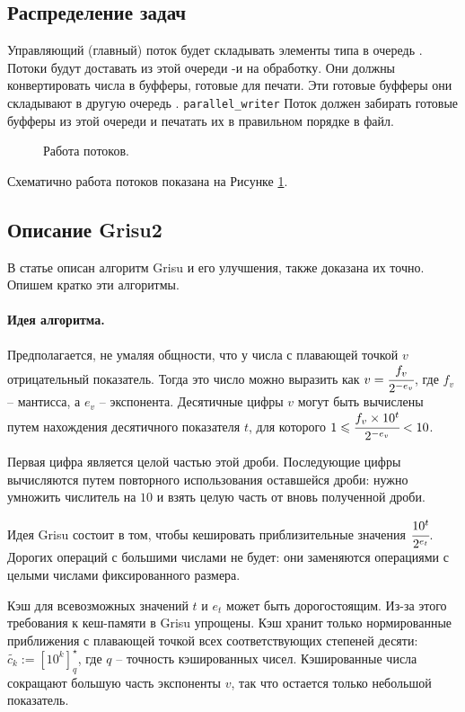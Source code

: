 \documentclass[a4paper, 12pt, twoside]{article}
\begin{document}
\subsection{Распределение задач}
Управляющий (главный) поток будет складывать элементы типа \texttt{} в очередь \texttt{}.
Потоки \texttt{} будут доставать из этой очереди \texttt{}-и на обработку.
Они должны конвертировать числа в буфферы, готовые для печати.
Эти готовые буфферы \texttt{} они складывают в другую очередь \texttt{}.
\texttt{\textcolor[rgb]{0.5,0,0}{parallel\_writer}}
Поток \texttt{} должен забирать готовые буфферы из этой очереди и печатать их в правильном порядке в файл.
\begin{figure}[h!]
\def\svgwidth{430pt}
  
  \caption{Работа потоков.} \label{draw}
\end{figure}

Схематично работа потоков показана на Рисунке \ref{draw}.

\subsection{Описание \textsf{Grisu2}}
В статье \cite{1} описан алгоритм \textsf{Grisu} и его улучшения, также доказана их точно.
Опишем кратко эти алгоритмы.
\paragraph{Идея алгоритма.}
Предполагается, не умаляя общности, что у числа с плавающей точкой $v$ отрицательный показатель. 
Тогда это число можно выразить как $v=\cfrac{f_v}{2^{-e_v}}$, где $f_v$ -- мантисса, а $e_v$ -- экспонента. 
Десятичные цифры $v$ могут быть вычислены путем нахождения десятичного показателя $t$, для которого $1 \leqslant \cfrac{f_v \times 10^t}{2^{-e_v}} < 10$.

Первая цифра является целой частью этой дроби. 
Последующие цифры вычисляются путем повторного использования оставшейся дроби: нужно умножить числитель на $10$ и взять целую часть от вновь полученной дроби.

Идея \textsf{Grisu} состоит в том, чтобы кешировать приблизительные значения $\cfrac{10^t}{2^{e_t}}$.
Дорогих операций с большими числами не будет: они заменяются операциями с целыми числами фиксированного размера.

Кэш для всевозможных значений $t$ и $e_t$ может быть дорогостоящим. 
Из-за этого требования к кеш-памяти в \textsf{Grisu} упрощены. 
Кэш хранит только нормированные приближения с плавающей точкой всех соответствующих степеней десяти: $\tilde{c_k} := \left[ 10^k \right]_q^{\star}$, где $q$ -- точность кэшированных чисел.
Кэшированные числа сокращают большую часть экспоненты $v$, так что остается только небольшой показатель. 
\end{document}

